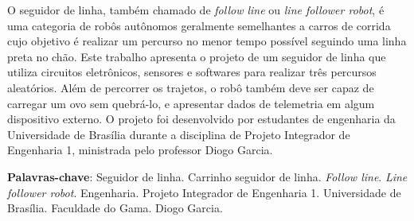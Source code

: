 \setlength{\absparsep}{18pt}
\begin{resumo}
  O seguidor de linha, também chamado de \textit{follow line} ou
  \textit{line follower robot}, é uma categoria de robôs autônomos geralmente
  semelhantes a carros de corrida cujo objetivo é realizar um percurso no menor
  tempo possível seguindo uma linha preta no chão. Este trabalho apresenta o
  projeto de um seguidor de linha que utiliza circuitos eletrônicos, sensores e
  softwares para realizar três percursos aleatórios. Além de percorrer os
  trajetos, o robô também deve ser capaz de carregar um ovo sem quebrá-lo, e
  apresentar dados de telemetria em algum dispositivo externo. O projeto
  foi desenvolvido por estudantes de engenharia da Universidade de Brasília
  durante a disciplina de Projeto Integrador de Engenharia 1, ministrada pelo
  professor Diogo Garcia.

  \textbf{Palavras-chave}:
    Seguidor de linha. Carrinho seguidor de linha. \textit{Follow line}.
    \textit{Line follower robot}. Engenharia. Projeto Integrador de Engenharia
    1. Universidade de Brasília. Faculdade do Gama. Diogo Garcia.
\end{resumo}
